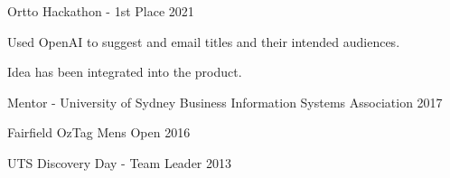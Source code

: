 \begin{extracurricular}
  \ecitem
  {Ortto Hackathon - 1st Place} %
  {2021} %
  {
    \begin{cvitems} %
      \item {Used OpenAI to suggest and email titles and their intended audiences.}
      \item {Idea has been integrated into the product.}
    \end{cvitems}
  }

  \ecitem
  {Mentor - University of Sydney Business Information Systems Association} %
  {2017} %
  {} %

  \ecitem
  {Fairfield OzTag Mens Open} %
  {2016} %
  {} %

  \ecitem
  {UTS Discovery Day - Team Leader} %
  {2013} %
  {} %

\end{extracurricular}
